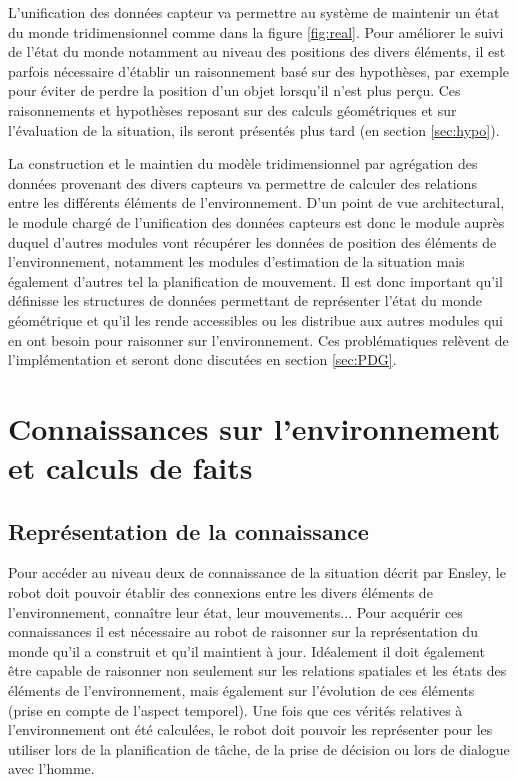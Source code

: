 \documentclass[a4paper,11pt,twoside]{StyleThese}
\begin{document}
L'unification des données capteur va permettre au système de maintenir un état du monde tridimensionnel comme dans la figure \ref{fig:real}. Pour améliorer le suivi de l'état du monde notamment au niveau des positions des divers éléments, il est parfois nécessaire d'établir un raisonnement basé sur des hypothèses, par exemple pour éviter de perdre la position d'un objet lorsqu'il n'est plus perçu. Ces raisonnements et hypothèses reposant sur des calculs géométriques et sur l'évaluation de la situation, ils seront présentés plus tard (en section \ref{sec:hypo}). 

La construction et le maintien du modèle tridimensionnel par agrégation des données provenant des divers capteurs va permettre de calculer des relations entre les différents éléments de l'environnement.
D'un point de vue architectural, le module chargé de l'unification des données capteurs est donc le module auprès duquel d'autres modules vont récupérer les données de position des éléments de l'environnement, notamment les modules d'estimation de la situation mais également d'autres tel la planification de mouvement. Il est donc important qu'il définisse les structures de données permettant de représenter l'état du monde géométrique et qu'il les rende accessibles ou les distribue aux autres modules qui en ont besoin pour raisonner sur l'environnement. Ces problématiques relèvent de l'implémentation et seront donc discutées en section \ref{sec:PDG}.


\section{Connaissances sur l'environnement et calculs de faits}
\label{sec:calculs}
\subsection{Représentation de la connaissance}
\label{sec:facts}

Pour accéder au niveau deux de connaissance de la situation décrit par Ensley, le robot doit pouvoir établir des connexions entre les divers éléments de l'environnement, connaître leur état, leur mouvements... Pour acquérir ces connaissances il est nécessaire au robot de raisonner sur la représentation du monde qu'il a construit et qu'il maintient à jour. Idéalement il doit également être capable de raisonner non seulement sur les relations spatiales et les états des éléments de l'environnement, mais également sur l'évolution de ces éléments (prise en compte de l'aspect temporel). Une fois que ces vérités relatives à l'environnement ont été calculées, le robot doit pouvoir les représenter pour les utiliser lors de la planification de tâche, de la prise de décision ou lors de dialogue avec l'homme.
\end{document}
